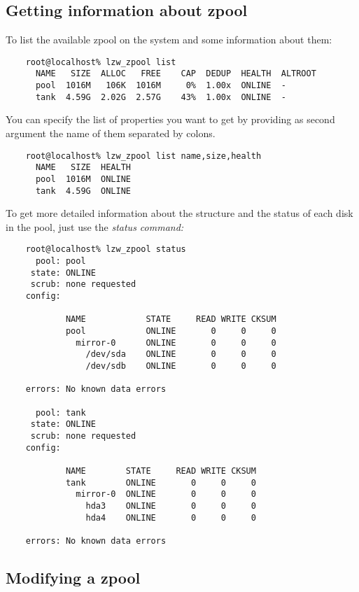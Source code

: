 \documentclass[english]{article}
\begin{document}
\subsection{Getting information about zpool}

To list the available zpool on the system and some information about them:
\begin{verbatim}
    root@localhost% lzw_zpool list
      NAME   SIZE  ALLOC   FREE    CAP  DEDUP  HEALTH  ALTROOT
      pool  1016M   106K  1016M     0%  1.00x  ONLINE  -
      tank  4.59G  2.02G  2.57G    43%  1.00x  ONLINE  -
\end{verbatim}

You can specify the list of properties you want to get by providing as second
argument the name of them separated by colons.
\begin{verbatim}
    root@localhost% lzw_zpool list name,size,health
      NAME   SIZE  HEALTH
      pool  1016M  ONLINE
      tank  4.59G  ONLINE
\end{verbatim}

To get more detailed information about the structure and the status of each disk in the pool, just use the \it{status} command:
\begin{verbatim}
    root@localhost% lzw_zpool status
      pool: pool
     state: ONLINE
     scrub: none requested
    config:
    
            NAME            STATE     READ WRITE CKSUM
            pool            ONLINE       0     0     0
              mirror-0      ONLINE       0     0     0
                /dev/sda    ONLINE       0     0     0
                /dev/sdb    ONLINE       0     0     0
    
    errors: No known data errors
    
      pool: tank
     state: ONLINE
     scrub: none requested
    config:
    
            NAME        STATE     READ WRITE CKSUM
            tank        ONLINE       0     0     0
              mirror-0  ONLINE       0     0     0
                hda3    ONLINE       0     0     0
                hda4    ONLINE       0     0     0
    
    errors: No known data errors
\end{verbatim}

\subsection{Modifying a zpool}
\end{document}
